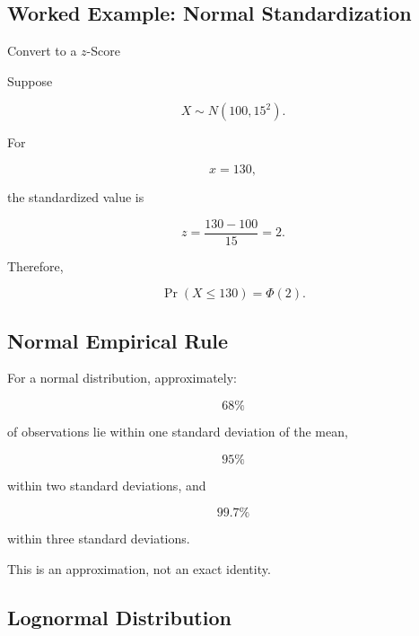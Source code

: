 \subsection{Worked Example: Normal Standardization}
\label{subsec:worked-normal-standardization}

\begin{workedexamplebox}{Convert to a \(z\)-Score}

Suppose

\[
X\sim N(100,15^2).
\]

For

\[
x=130,
\]

the standardized value is

\[
z
=
\frac{
130-100
}{
15
}
=
2.
\]

Therefore,

\begin{answerbox}
\[
\boxed{
\Pr(X\leq130)
=
\Phi(2).
}
\]
\end{answerbox}

\end{workedexamplebox}

\subsection{Normal Empirical Rule}
\label{subsec:normal-empirical-rule}

For a normal distribution, approximately:

\[
\boxed{
68\%
}
\]

of observations lie within one standard deviation of the mean,

\[
\boxed{
95\%
}
\]

within two standard deviations, and

\[
\boxed{
99.7\%
}
\]

within three standard deviations.

This is an approximation, not an exact identity.

\subsection{Lognormal Distribution}
\label{subsec:lognormal-distribution-reference}

